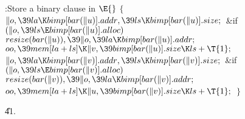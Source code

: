 \B{}:Store a binary clause in \X${}\E{}$\6
${}\{{}$\1\6
${}\|o,\39\\{la}\K\\{bimp}[\\{bar}(\|u)].\\{addr},\39\\{ls}\K\\{bimp}[\\{bar}(%
\|u)].\\{size};{}$\6
\&{if} ${}(\|o,\39\\{ls}\E\\{bimp}[\\{bar}(\|u)].\\{alloc}){}$\1\5
${}\\{resize}(\\{bar}(\|u)),\39\|o,\39\\{la}\K\\{bimp}[\\{bar}(\|u)].%
\\{addr};{}$\2\6
${}\\{oo},\39\\{mem}[\\{la}+\\{ls}]\K\|v,\39\\{bimp}[\\{bar}(\|u)].\\{size}\K%
\\{ls}+\T{1};{}$\6
${}\|o,\39\\{la}\K\\{bimp}[\\{bar}(\|v)].\\{addr},\39\\{ls}\K\\{bimp}[\\{bar}(%
\|v)].\\{size};{}$\6
\&{if} ${}(\|o,\39\\{ls}\E\\{bimp}[\\{bar}(\|v)].\\{alloc}){}$\1\5
${}\\{resize}(\\{bar}(\|v)),\39\|o,\39\\{la}\K\\{bimp}[\\{bar}(\|v)].%
\\{addr};{}$\2\6
${}\\{oo},\39\\{mem}[\\{la}+\\{ls}]\K\|u,\39\\{bimp}[\\{bar}(\|v)].\\{size}\K%
\\{ls}+\T{1};{}$\6
\4${}\}{}$\2\par
\U41.\fi

